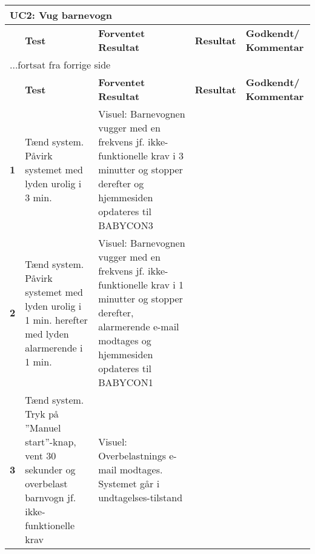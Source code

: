 \begin{center}
	\label{accepttest:uc2} 
\begin{longtable}{|p{}|p{}|p{}|p{}|p{}|} %
\hline
\multicolumn{5}{|l|}{\textbf{UC2: Vug barnevogn}} \\ \hline
\multicolumn{1}{|c|}{} &
\textbf{Test} &
\textbf{Forventet \newline Resultat} &
\textbf{Resultat} &
\textbf{Godkendt/ \newline Kommentar} \\ \hline 
\endfirsthead

\multicolumn{5}{l}{...fortsat fra forrige side} \\ \hline 
\multicolumn{1}{|c|}{} &
\textbf{Test} &
\textbf{Forventet \newline Resultat} &
\textbf{Resultat} &
\textbf{Godkendt/ \newline Kommentar} \\ \hline 
\endhead



\textbf{1}	&Tænd system. Påvirk systemet med lyden urolig i 3 min.
			&Visuel: Barnevognen vugger med en frekvens jf. ikke-funktionelle krav i 3 minutter og 
			 stopper derefter og hjemmesiden opdateres til BABYCON3
			&
			& 
			\\\hline

\textbf{2}	&Tænd system. Påvirk systemet med lyden urolig i 1 min. herefter med lyden alarmerende i 1 min.
			&Visuel: Barnevognen vugger med en frekvens jf. ikke-funktionelle krav i 1 minutter og 
			 stopper derefter, alarmerende e-mail modtages og hjemmesiden opdateres til BABYCON1
			&
			& 
			\\\hline
			 
\textbf{3}	&Tænd system. Tryk på ''Manuel start''-knap, vent 30 sekunder og overbelast barnvogn jf. ikke-funktionelle krav
			&Visuel: Overbelastnings e-mail modtages. Systemet går i undtagelses-tilstand
			&
			&
			\\\hline

\end{longtable}
\end{center}
